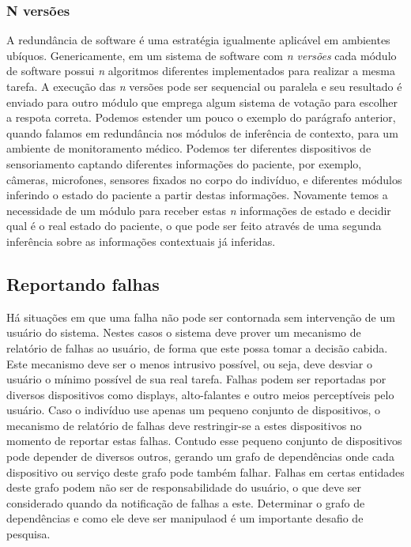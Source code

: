 
\subsubsection*{N versões} %

A redundância de software é uma estratégia igualmente aplicável em ambientes ubíquos. Genericamente, em um sistema de software com \emph{n versões} cada módulo de software possui \emph{n} algoritmos diferentes implementados para realizar a mesma tarefa. A execução das \emph{n} versões pode ser sequencial ou paralela e seu resultado é enviado para outro módulo que emprega algum sistema de votação para escolher a respota correta. Podemos estender um pouco o exemplo do parágrafo anterior, quando falamos em redundância nos módulos de inferência de contexto, para um ambiente de monitoramento médico. Podemos ter diferentes dispositivos de sensoriamento captando diferentes informações do paciente, por exemplo, câmeras, microfones, sensores fixados no corpo do indivíduo, e diferentes módulos inferindo o estado do paciente a partir destas informações. Novamente temos a necessidade de um módulo para receber estas \emph{n} informações de estado e decidir qual é o real estado do paciente, o que pode ser feito através de uma segunda inferência sobre as informações contextuais já inferidas.


\subsection{Reportando falhas} %
\label{sub:reportando_falhas}

Há situações em que uma falha não pode ser contornada sem intervenção de um usuário do sistema. Nestes casos o sistema deve prover um mecanismo de relatório de falhas ao usuário, de forma que este possa tomar a decisão cabida. Este mecanismo deve ser o menos intrusivo possível, ou seja, deve desviar o usuário o mínimo possível de sua real tarefa. Falhas podem ser reportadas por diversos dispositivos como displays, alto-falantes e outro meios perceptíveis pelo usuário. Caso o indivíduo use apenas um pequeno conjunto de dispositivos, o mecanismo de relatório de falhas deve restringir-se a estes dispositivos no momento de reportar estas falhas. Contudo esse pequeno conjunto de dispositivos pode depender de diversos outros, gerando um grafo de dependências onde cada dispositivo ou serviço deste grafo pode também falhar. Falhas em certas entidades deste grafo podem não ser de responsabilidade do usuário, o que deve ser considerado quando da notificação de falhas a este. Determinar o grafo de dependências e como ele deve ser manipulaod é um importante desafio de pesquisa.

